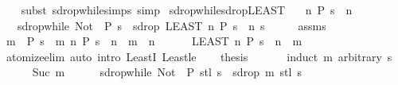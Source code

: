 \begin{isabellebody}
%
\isadelimproof
\ \ %
\endisadelimproof
%
\isatagproof
{}\isamarkupfalse%
\ {\isacharparenleft}subst\ sdrop{\isacharunderscore}while{\isachardot}simps{\isacharparenright}\ simp%
\endisatagproof
{\isafoldproof}%
%
\isadelimproof
\isanewline
%
\endisadelimproof
\isanewline
{}\isamarkupfalse%
\ sdrop{\isacharunderscore}while{\isacharunderscore}sdrop{\isacharunderscore}LEAST{\isacharcolon}\isanewline
\ \ \ {\isachardoublequoteopen}{\isasymexists}n{\isachardot}\ P\ {\isacharparenleft}s\ {\isacharbang}{\isacharbang}\ n{\isacharparenright}{\isachardoublequoteclose}\isanewline
\ \ \ {\isachardoublequoteopen}sdrop{\isacharunderscore}while\ {\isacharparenleft}Not\ {\isasymcirc}\ P{\isacharparenright}\ s\ {\isacharequal}\ sdrop\ {\isacharparenleft}LEAST\ n{\isachardot}\ P\ {\isacharparenleft}s\ {\isacharbang}{\isacharbang}\ n{\isacharparenright}{\isacharparenright}\ s{\isachardoublequoteclose}\isanewline
%
\isadelimproof
%
\endisadelimproof
%
\isatagproof
{}\isamarkupfalse%
\ {\isacharminus}\isanewline
\ \ \isamarkupfalse%
\ assms\ \isamarkupfalse%
\ m\ \ {\isachardoublequoteopen}P\ {\isacharparenleft}s\ {\isacharbang}{\isacharbang}\ m{\isacharparenright}{\isachardoublequoteclose}\ {\isachardoublequoteopen}{\isasymAnd}n{\isachardot}\ P\ {\isacharparenleft}s\ {\isacharbang}{\isacharbang}\ n{\isacharparenright}\ {\isasymLongrightarrow}\ m\ {\isasymle}\ n{\isachardoublequoteclose}\isanewline
\ \ \ \ \ {\isacharasterisk}{\isacharcolon}\ {\isachardoublequoteopen}{\isacharparenleft}LEAST\ n{\isachardot}\ P\ {\isacharparenleft}s\ {\isacharbang}{\isacharbang}\ n{\isacharparenright}{\isacharparenright}\ {\isacharequal}\ m{\isachardoublequoteclose}\ \isamarkupfalse%
\ atomize{\isacharunderscore}elim\ {\isacharparenleft}auto\ intro{\isacharcolon}\ LeastI\ Least{\isacharunderscore}le{\isacharparenright}\isanewline
\ \ \isamarkupfalse%
\ {\isacharquery}thesis\ \isamarkupfalse%
\ {\isacharasterisk}\isanewline
\ \ \isamarkupfalse%
\ {\isacharparenleft}induct\ m\ arbitrary{\isacharcolon}\ s{\isacharparenright}\isanewline
\ \ \ \ \isamarkupfalse%
\ {\isacharparenleft}Suc\ m{\isacharparenright}\isanewline
\ \ \ \ \isamarkupfalse%
\ {\isachardoublequoteopen}sdrop{\isacharunderscore}while\ {\isacharparenleft}Not\ {\isasymcirc}\ P{\isacharparenright}\ {\isacharparenleft}stl\ s{\isacharparenright}\ {\isacharequal}\ sdrop\ m\ {\isacharparenleft}stl\ s{\isacharparenright}{\isachardoublequoteclose}\isanewline

\end{isabellebody}
